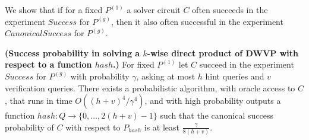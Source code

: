 We show that if for a fixed $P^{(1)}$ a solver circuit $C$ often succeeds in the experiment $Success$ for $P^{(g)}$,
then it also often successful in the experiment $CanonicalSuccess$ for $P^{(g)}$.
%
\begin{lemma}\textbf{(Success probability in solving a $k$-wise direct product of DWVP with respect to a function $hash$.)}
\label{lemma:hash_function_probability}
For fixed $P^{(1)}$ let $C$ succeed in the experiment $Success$ for $P^{(g)}$ with probability $\gamma$,
asking at most $h$ hint queries and $v$ verification queries.
There exists a probabilistic algorithm, with oracle access to $C$, that runs in time $O((h+v)^4/\gamma^4)$,
and with high probability outputs a function $hash: Q \rightarrow \{0, \dots, 2(h+v)-1\}$ such that the canonical success probability of
$C$ with respect to $P_{hash}$ is at least $\frac{\gamma}{8(h+v)}$.
\end{lemma}
%
